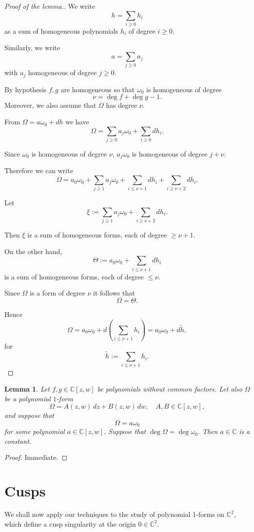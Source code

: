 \documentclass[11pt,a4paper]{amsart}
\newtheorem{lemma}[theorem]{Lemma}
\theoremstyle{definition}
\begin{document}
\begin{proof}[Proof of the lemma.]
We write
\[
h=\sum_{i\ge0} h_i
\]
as a sum of homogeneous polynomials $h_i$ of degree $i\ge0$.

Similarly, we write
\[
a=\sum_{j\ge0} a_j
\]
with $a_j$ homogeneous of degree $j\ge0$.

By hypothesis $f,g$ are homogeneous
so that $\omega_0$ is homogeneous of degree
\[
\nu=\deg f+\deg g-1.
\]
Moreover, we also assume that $\Omega$ has degree $\nu$.

From $\Omega=a\omega_0+dh$ we have
\[
\Omega
=
\sum_{j\ge0} a_j \omega_0
+
\sum_{i\ge0} d h_i .
\]

Since $\omega_0$ is homogeneous of degree $\nu$,
$a_j\omega_0$ is homogeneous of degree $j+\nu$.

Therefore we can write
\[
\Omega
=
a_0 \omega_0
+
\sum_{j\ge1} a_j \omega_0
+
\sum_{i\le \nu+1} d h_i
+
\sum_{i\ge \nu+2} d h_i .
\]

Let
\[
\xi
:=
\sum_{j\ge1} a_j \omega_0
+
\sum_{i\ge \nu+2} d h_i .
\]

Then $\xi$ is a sum of homogeneous forms,
each of degree $\ge \nu+1$.

On the other hand,
\[
\Theta
:=
a_0 \omega_0
+
\sum_{i\le \nu+1} d h_i
\]
is a sum of homogeneous forms,
each of degree $\le \nu$.

Since $\Omega$ is a form of degree $\nu$
it follows that
\[
\Omega=\Theta.
\]

Hence
\[
\Omega
=
a_0 \omega_0
+
d\!\left(\sum_{i\le \nu+1} h_i\right)
=
a_0 \omega_0 + d\tilde h,
\]
for
\[
\tilde h := \sum_{i\le \nu+1} h_i.
\]
\end{proof}
\begin{lemma}
\label{lemma:aisconstant}
Let $f,g\in\mathbb{C}[z,w]$ be polynomials without common factors.
Let also $\Omega$ be a polynomial $1$-form
\[
\Omega = A(z,w)\,dz + B(z,w)\,dw,
\quad A,B\in\mathbb{C}[z,w],
\]
and suppose that
\[
\Omega = a \omega_0
\]
for some polynomial $a\in\mathbb{C}[z,w]$.
Suppose that $\deg\Omega = \deg \omega_0$.
Then $a\in\mathbb{C}$ is a constant.
\end{lemma}
\begin{proof} Immediate.
\end{proof}

\section{Cusps}
We shall now apply our techniques to the study of polynomial 1-forms on $\mathbb C^2$, which define 
a cusp singularity at the origin $0\in \mathbb C^2$. 
\label{section:cusps}
\end{document}
